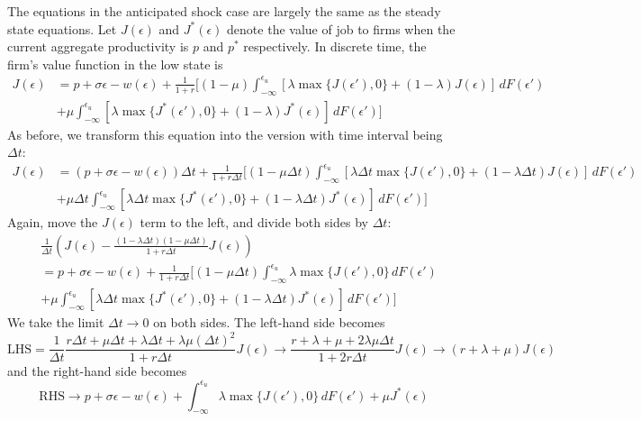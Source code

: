 \documentclass[12pt]{article}
\begin{document}
The equations in the anticipated shock case are largely the same as the steady state equations. Let $J(\epsilon)$ and $J^*(\epsilon)$ denote the value of job to firms when the current aggregate productivity is $p$ and $p^*$ respectively. In discrete time, the firm's value function in the low state is
\begin{align}
	J(\epsilon) & = p + \sigma \epsilon - w(\epsilon) + \frac{1}{1+r} \Bigg[(1-\mu) \int_{-\infty}^{\epsilon_u} [\lambda \max\{J(\epsilon'), 0\} + (1-\lambda) J(\epsilon)] \, dF(\epsilon') \nonumber \\ & + \mu \int_{-\infty}^{\epsilon_u} [\lambda \max\{J^*(\epsilon'), 0\} + (1-\lambda) J^*(\epsilon)] \, dF(\epsilon')\Bigg]
\end{align}
As before, we transform this equation into the version with time interval being $\Delta t$:
\begin{align}
	J(\epsilon) & = (p + \sigma \epsilon - w(\epsilon))\Delta t + \frac{1}{1+r \Delta t} \Bigg[(1-\mu \Delta t) \int_{-\infty}^{\epsilon_u} [\lambda \Delta t \max\{J(\epsilon'), 0\} + (1-\lambda \Delta t) J(\epsilon)] \, dF(\epsilon') \nonumber \\ & + \mu \Delta t \int_{-\infty}^{\epsilon_u} [\lambda \Delta t \max\{J^*(\epsilon'), 0\} + (1-\lambda \Delta t) J^*(\epsilon)] \, dF(\epsilon')\Bigg]
\end{align}
Again, move the $J(\epsilon)$ term to the left, and divide both sides by $\Delta t$: 
\begin{align}
	& \frac{1}{\Delta t}\left(J(\epsilon) - \frac{(1 - \lambda \Delta t)(1 - \mu \Delta t)}{1 + r \Delta t} J(\epsilon) \right) \nonumber \\ 
	& =p + \sigma \epsilon - w(\epsilon) + \frac{1}{1+r \Delta t} \Bigg[(1-\mu \Delta t) \int_{-\infty}^{\epsilon_u} \lambda  \max\{J(\epsilon'), 0\} \, dF(\epsilon') \nonumber \\
	&  + \mu  \int_{-\infty}^{\epsilon_u} [\lambda \Delta t \max\{J^*(\epsilon'), 0\}+ (1-\lambda \Delta t) J^*(\epsilon) ] \, dF(\epsilon')\Bigg] \nonumber
\end{align}
We take the limit $\Delta t \to 0$ on both sides. The left-hand side becomes
\[\text{LHS} = \frac{1}{\Delta t} \frac{r\Delta t + \mu \Delta t + \lambda \Delta t + \lambda \mu (\Delta t)^2}{1 + r \Delta t} J(\epsilon) \to \frac{r + \lambda + \mu + 2 \lambda \mu \Delta t}{1 + 2 r \Delta t} J(\epsilon) \to (r + \lambda + \mu ) J (\epsilon)\]
and the right-hand side becomes
\[\text{RHS} \to p + \sigma \epsilon - w(\epsilon) + \int_{-\infty}^{\epsilon_u} \lambda  \max\{J(\epsilon'), 0\} \, dF(\epsilon') + \mu  J^*(\epsilon)   \]
\end{document}
